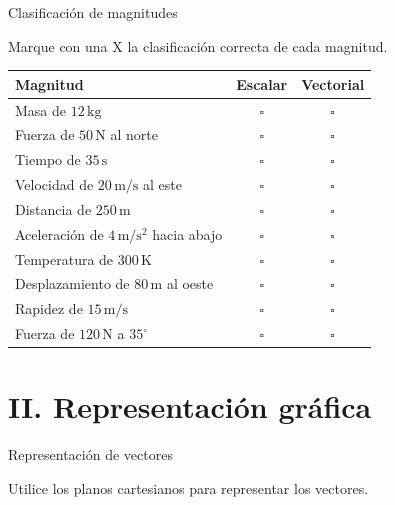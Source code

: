 \documentclass[11pt,letterpaper]{article}
\begin{document}
\begin{seccion}{
Clasificación de magnitudes
}

Marque con una X la clasificación
correcta de cada magnitud.

\begin{center}
\renewcommand{\arraystretch}{1.6}

\begin{tabular}{|p{8cm}|c|c|}
\hline
\textbf{Magnitud}
& \textbf{Escalar}
& \textbf{Vectorial}\\
\hline
Masa de $12\,\mathrm{kg}$
& $\square$ & $\square$\\
\hline
Fuerza de $50\,\mathrm{N}$ al norte
& $\square$ & $\square$\\
\hline
Tiempo de $35\,\mathrm{s}$
& $\square$ & $\square$\\
\hline
Velocidad de $20\,\mathrm{m/s}$ al este
& $\square$ & $\square$\\
\hline
Distancia de $250\,\mathrm{m}$
& $\square$ & $\square$\\
\hline
Aceleración de $4\,\mathrm{m/s^2}$
hacia abajo
& $\square$ & $\square$\\
\hline
Temperatura de $300\,\mathrm{K}$
& $\square$ & $\square$\\
\hline
Desplazamiento de $80\,\mathrm{m}$
al oeste
& $\square$ & $\square$\\
\hline
Rapidez de $15\,\mathrm{m/s}$
& $\square$ & $\square$\\
\hline
Fuerza de $120\,\mathrm{N}$
a $35^\circ$
& $\square$ & $\square$\\
\hline
\end{tabular}
\end{center}

\end{seccion}

\newpage

\section*{II. Representación gráfica}

\begin{seccion}{
Representación de vectores
}

Utilice los planos cartesianos
para representar los vectores.

\end{seccion}
\end{document}

